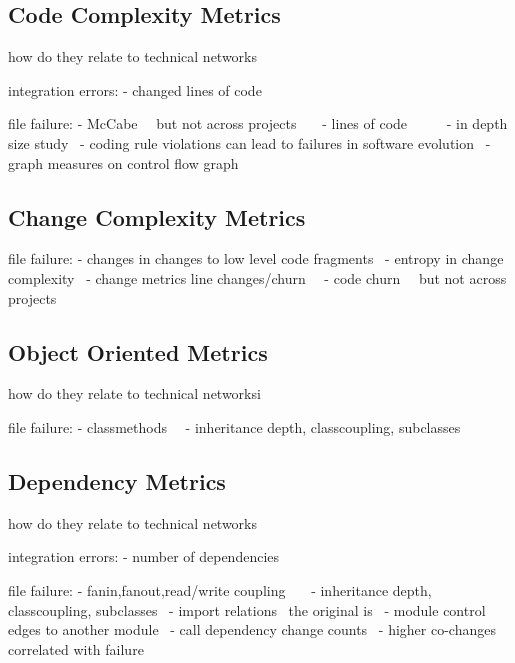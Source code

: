\subsection{Code Complexity Metrics}
how do they relate to technical networks

integration errors:
- changed lines of code~\cite{cataldo:icse:2011}

file failure:
- McCabe~\cite{nagappan:icse:2006}~\cite{shihab:fse:2011} but not across projects~\cite{zimmermann:fse:2009}~\cite{jiang:promise:2008}~\cite{zimmermann:promise:2007}
- lines of code~\cite{shihab:esem:2010}~\cite{arisholm:isese:2006}~\cite{jiang:promise:2008}~\cite{knab:msr:2006}~\cite{zhang:icsm:2009}
- in depth size study~\cite{koru:promise:2005}
- coding rule violations can lead to failures in software evolution~\cite{matsumura:isese:2002}
- graph measures on control flow graph~\cite{nikora:metrics:2005}

\subsection{Change Complexity Metrics}
file failure:
- changes in changes to low level code fragments~\cite{giger:msr:2011}
- entropy in change complexity~\cite{hassan:icse:2009}
- change metrics line changes/churn~\cite{moser:icse:2008}~\cite{li:metrics:2005}
- code churn~\cite{nagappan:icse:2005}~\cite{shihab:fse:2011} but not across projects~\cite{zimmermann:fse:2009}~\cite{bell:promise:2011}

\subsection{Object Oriented Metrics}
how do they relate to technical networksi

file failure:
- classmethods~\cite{nagappan:icse:2006}~\cite{arisholm:isese:2006}
- inheritance depth, classcoupling, subclasses~\cite{nagappan:icse:2006}~\cite{arisholm:isese:2006}~\cite{english:promise:2009}

\subsection{Dependency Metrics}
how do they relate to technical networks

integration errors:
- number of dependencies~\cite{cataldo:icse:2011}

file failure:
- fanin,fanout,read/write coupling~\cite{nagappan:icse:2006}~\cite{arisholm:isese:2006}~\cite{knab:msr:2006}
- inheritance depth, classcoupling, subclasses~\cite{nagappan:icse:2006}
- import relations~\cite{dualaekoko:esem:2009} the original is~\cite{schroeter:isese:2006}
- module control edges to another module~\cite{jiang:promise:2008}
- call dependency change counts~\cite{shin:msr:2009}
- higher co-changes correlated with failure~\cite{dambros:wcre:2009}

